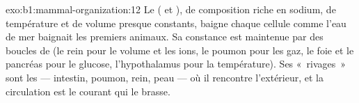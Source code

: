 \begin{solution}{exo:b1:mammal-organization:12}
Le  ( et ), de
composition riche en sodium, de température et de volume presque
constants, baigne chaque cellule comme l'eau de mer baignait les
premiers animaux. Sa constance est maintenue par des boucles de
 (le rein pour le volume et les ions, le poumon pour
les gaz, le foie et le pancréas pour le glucose, l'hypothalamus pour la
température). Ses «~rivages~» sont les  --- intestin,
poumon, rein, peau --- où il rencontre l'extérieur, et la circulation
est le courant qui le brasse.
\end{solution}

